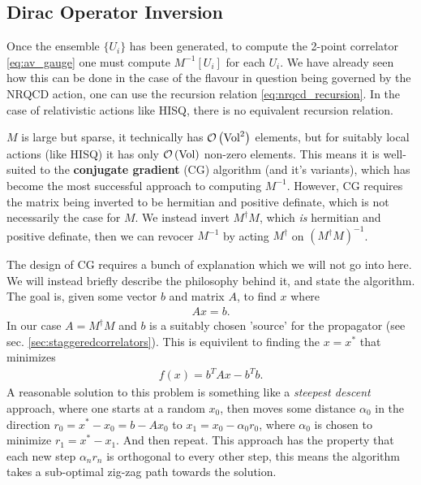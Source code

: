 \subsection{Dirac Operator Inversion}
\label{sec:inversions}

Once the ensemble $\{U_i\}$ has been generated, to compute the 2-point correlator \eqref{eq:av_gauge} one must compute $M^{-1}[U_i]$ for each $U_i$. We have already seen how this can be done in the case of the flavour in question being governed by the NRQCD action, one can use the recursion relation \eqref{eq:nrqcd_recursion}. In the case of relativistic actions like HISQ, there is no equivalent recursion relation.

$M$ is large but sparse, it technically has $\mathcal{O}\left( \text{Vol}^2 \right)$ elements, but for suitably local actions (like HISQ) it has only $\mathcal{O}\left( \text{Vol} \right)$ non-zero elements. This means it is well-suited to the {\bf{conjugate gradient}} (CG) algorithm \cite{Hestenes&Stiefel:1952} (and it's variants), which has become the most successful approach to computing $M^{-1}$. However, CG requires the matrix being inverted to be hermitian and positive definate, which is not necessarily the case for $M$. We instead invert $M^{\dagger}M$, which {\it{is}} hermitian and positive definate, then we can revocer $M^{-1}$ by acting $M^{\dagger}$ on $(M^{\dagger}M)^{-1}$.

The design of CG requires a bunch of explanation which we will not go into here. We will instead briefly describe the philosophy behind it, and state the algorithm. The goal is, given some vector $b$ and matrix $A$, to find $x$ where
\begin{align}
  Ax = b.
\end{align}
In our case $A=M^{\dagger}M$ and $b$ is a suitably chosen 'source' for the propagator (see sec. \ref{sec:staggeredcorrelators}). This is equivilent to finding the $x=x^*$ that minimizes
\begin{align}
  f(x) = b^TAx - b^Tb.
\end{align}
A reasonable solution to this problem is something like a {\it{steepest descent}} approach, where one starts at a random $x_0$, then moves some distance $\alpha_0$ in the direction $r_0 = x^* - x_0 = b-Ax_0$ to $x_1=x_0-\alpha_0 r_0$, where $\alpha_0$ is chosen to minimize $r_1= x^*-x_1$. And then repeat. This approach has the property that each new step $\alpha_n r_n$ is orthogonal to every other step, this means the algorithm takes a sub-optimal zig-zag path towards the solution.

